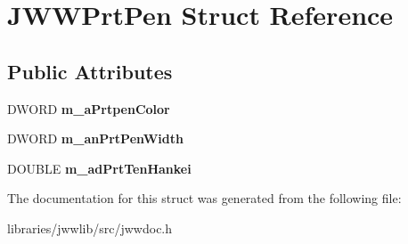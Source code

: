 \hypertarget{structJWWPrtPen}{\section{J\-W\-W\-Prt\-Pen Struct Reference}
\label{structJWWPrtPen}
}
\subsection*{Public Attributes}
\begin{DoxyCompactItemize}
\item 
\hypertarget{structJWWPrtPen_ab8a230859c1fd6ab5ffd8f6f5ea914a4}{D\-W\-O\-R\-D {\bfseries m\-\_\-a\-Prtpen\-Color}}\label{structJWWPrtPen_ab8a230859c1fd6ab5ffd8f6f5ea914a4}

\item 
\hypertarget{structJWWPrtPen_ad8eaa2269bf2e5937807d4884895356b}{D\-W\-O\-R\-D {\bfseries m\-\_\-an\-Prt\-Pen\-Width}}\label{structJWWPrtPen_ad8eaa2269bf2e5937807d4884895356b}

\item 
\hypertarget{structJWWPrtPen_a47be77bcc3f1cf643874547c3b559e88}{D\-O\-U\-B\-L\-E {\bfseries m\-\_\-ad\-Prt\-Ten\-Hankei}}\label{structJWWPrtPen_a47be77bcc3f1cf643874547c3b559e88}

\end{DoxyCompactItemize}


The documentation for this struct was generated from the following file\-:\begin{DoxyCompactItemize}
\item 
libraries/jwwlib/src/jwwdoc.\-h\end{DoxyCompactItemize}
